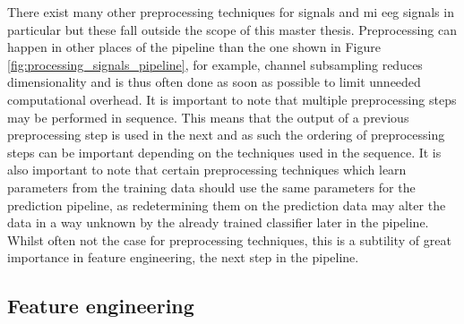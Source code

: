 There exist many other preprocessing techniques for signals and \gls{mi} \gls{eeg} signals in particular but these fall outside the scope of this master thesis.
Preprocessing can happen in other places of the pipeline than the one shown in Figure \ref{fig:processing_signals_pipeline}, for example, channel subsampling reduces dimensionality and is thus often done as soon as possible to limit unneeded computational overhead.
It is important to note that multiple preprocessing steps may be performed in sequence.
This means that the output of a previous preprocessing step is used in the next and as such the ordering of preprocessing steps can be important depending on the techniques used in the sequence.
It is also important to note that certain preprocessing techniques which learn parameters from the training data should use the same parameters for the prediction pipeline, as redetermining them on the prediction data may alter the data in a way unknown by the already trained classifier later in the pipeline.
Whilst often not the case for preprocessing techniques, this is a subtility of great importance in feature engineering, the next step in the pipeline.





\subsection{Feature engineering}
\label{subsec:processing_signals_general_pipeline_features}



